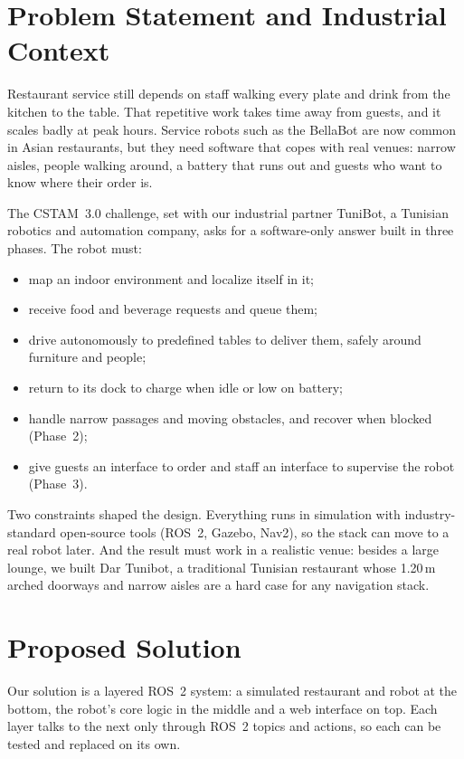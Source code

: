 \documentclass[11pt,a4paper]{article}
\begin{document}
\section{Problem Statement and Industrial Context}

Restaurant service still depends on staff walking every plate and drink
from the kitchen to the table. That repetitive work takes time away from
guests, and it scales badly at peak hours. Service robots such as the
BellaBot are now common in Asian restaurants, but they need software that
copes with real venues: narrow aisles, people walking around, a battery
that runs out and guests who want to know where their order is.

The CSTAM~3.0 challenge, set with our industrial partner TuniBot, a
Tunisian robotics and automation company, asks for a software-only answer
built in three phases. The robot must:
\begin{itemize}
  \item map an indoor environment and localize itself in it;
  \item receive food and beverage requests and queue them;
  \item drive autonomously to predefined tables to deliver them, safely around furniture and people;
  \item return to its dock to charge when idle or low on battery;
  \item handle narrow passages and moving obstacles, and recover when blocked (Phase~2);
  \item give guests an interface to order and staff an interface to supervise the robot (Phase~3).
\end{itemize}

Two constraints shaped the design. Everything runs in simulation with
industry-standard open-source tools (ROS~2, Gazebo, Nav2), so the stack
can move to a real robot later. And the result must work in a realistic
venue: besides a large lounge, we built Dar Tunibot, a traditional
Tunisian restaurant whose 1.20\,m arched doorways and narrow aisles are a
hard case for any navigation stack.

\section{Proposed Solution}

Our solution is a layered ROS~2 system: a simulated restaurant and robot at
the bottom, the robot's core logic in the middle and a web interface on
top. Each layer talks to the next only through ROS~2 topics and actions,
so each can be tested and replaced on its own.
\end{document}
